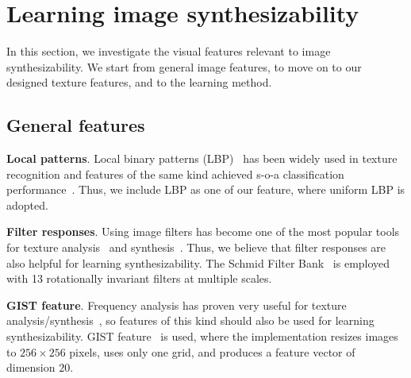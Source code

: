 \documentclass[10pt,twocolumn,letterpaper]{article}
\begin{document}

\section{Learning image synthesizability} 
\label{sec:feature}
In this section, we investigate the visual features relevant to 
image synthesizability. We start from general image features, to move
on to our designed texture features, and to the learning method.


\subsection{General features}


\textbf{Local patterns}. Local binary patterns (LBP)~\cite{lbp:2002}
has been widely used in texture recognition and features of the same
kind achieved s-o-a classification performance~\cite{sorted:texture}. Thus, 
we include LBP as one of our feature, where  uniform LBP is adopted.

\textbf{Filter responses}. Using image filters has become one of the
most popular tools for texture analysis~\cite{texton:2001, Manjunath96}
and synthesis~\cite{zhu:frame}. Thus, we believe that filter responses
are also helpful for learning synthesizability. The Schmid Filter
Bank~\cite{Schmid01} is employed with 13 rotationally invariant
filters at multiple scales.

\textbf{GIST feature}.  Frequency analysis has proven  very useful for
texture analysis/synthesis~\cite{vangool:83, Manjunath96, Debonet:97}, so features of this kind 
should also be used for learning synthesizability.
GIST feature~\cite{gist} is used, where the 
implementation resizes images to $256 \times 256$ pixels, uses only
one grid, and produces a feature vector of dimension $20$.

\end{document}
